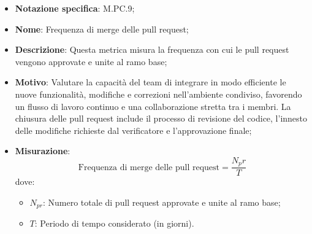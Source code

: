 \begin{itemize}
    \item \textbf{Notazione specifica}: M.PC.9;
    \item \textbf{Nome}: Frequenza di merge delle pull request;
    \item \textbf{Descrizione}: Questa metrica misura la frequenza con cui le pull request vengono approvate e unite al ramo base;
    \item \textbf{Motivo}: Valutare la capacità del team di integrare in modo efficiente le nuove funzionalità, modifiche e correzioni nell’ambiente condiviso, favorendo un flusso di lavoro continuo e una collaborazione  stretta tra i membri. La chiusura delle pull request include il processo di revisione del codice, l’innesto delle modifiche richieste dal verificatore e l’approvazione finale;
    \item \textbf{Misurazione}:
    \[
        \text{Frequenza di merge delle pull request} =\frac{N_pr}{T} 
    \]
    dove:
    \begin{itemize}
        \item $N_{pr}$: Numero totale di pull request approvate e unite al ramo base;
        \item $T$: Periodo di tempo considerato (in giorni).
    \end{itemize}
\end{itemize}
